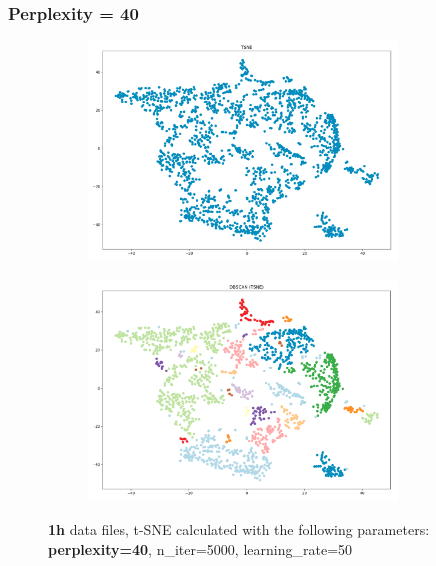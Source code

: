 \subsubsection{Perplexity = 40}
\begin{figure}[H]
  \centering
  \begin{subfigure}{.5\textwidth}
    \centering
    \includegraphics[width=0.9\textwidth]{./images/tsneParametersTest/perplexity/perp40-1hTSNE.png}
  \end{subfigure}%
  \begin{subfigure}{.5\textwidth}
    \centering
    \includegraphics[width=0.9\textwidth]{./images/tsneParametersTest/perplexity/perp40-1hDBSCAN.png}
  \end{subfigure}
	\caption{\textbf{1h} data files, t-SNE calculated with the following parameters: \textbf{perplexity=40}, n\_iter=5000, learning\_rate=50}
  \label{figure:1hperp40TSNE}
\end{figure}

